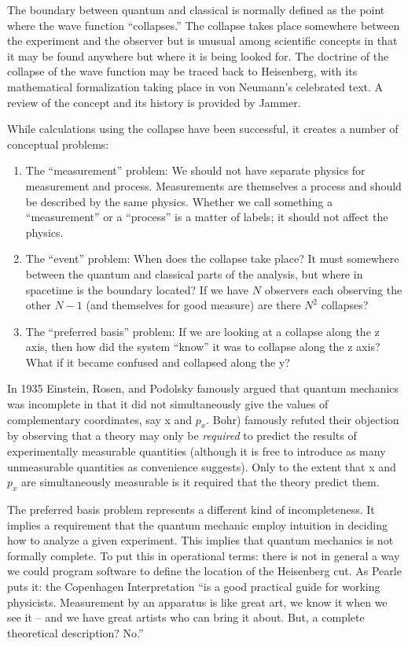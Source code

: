 \documentclass[aps,prl,superscriptaddress,12pt]{revtex4-2}
\begin{document}
The boundary between quantum and classical is normally defined as the point where the wave function ``collapses.''
The collapse takes place somewhere between the experiment and the observer 
	but is unusual among scientific concepts in that it may be found anywhere 
	but where it is being looked for. 
The doctrine of the collapse of the wave function may be traced back to Heisenberg\cite{Heisenberg:1930}, 
	with its mathematical formalization taking place in von Neumann's celebrated text\cite{vonNeumann:1955}. 
A review of the concept and its history is provided by Jammer\cite{Jammer:1966,Jammer:1974}.

While calculations using the collapse have been successful, 
	it creates a number of conceptual problems\cite{Ghose:1999}:
\begin{enumerate}
\item The ``measurement'' problem: 
	We should not have separate physics for measurement and process. 
	Measurements are themselves a process 
		and should be described by the same physics. 
	Whether we call something a ``measurement'' or a ``process'' 
		is a matter of labels; it should not affect the physics.
\item The ``event'' problem: 
	When does the collapse take place? 
	It must somewhere between the quantum and classical parts of the analysis, 
		but where in spacetime is the boundary located? 
	If we have $N$ observers each observing the other $N - 1$ 
		(and themselves for good measure) 
		are there $N^{2}$ collapses?
\item The ``preferred basis'' problem: 
	If we are looking at a collapse along the z axis, 
		then how did the system ``know'' it was to collapse along the z axis? 
	What if it became confused and collapsed along the y?
\end{enumerate}

In 1935 Einstein, Rosen, and Podolsky\cite{Einstein:1935} famously argued that quantum mechanics was incomplete 
in that it did not simultaneously give the values of complementary coordinates, say x and $p_x$.  
Bohr\cite{Bohr:1935}) famously refuted their objection by observing 
that a theory may only be \emph{required} to predict the results of experimentally measurable quantities 
(although it is free to introduce as many unmeasurable quantities as convenience suggests).
Only to the extent that  x and $p_x$ are simultaneously measurable 
	is it required that the theory predict them.

The preferred basis problem represents a different kind of incompleteness.
It implies a requirement that the quantum mechanic employ intuition 
	in deciding how to analyze a given experiment. 
This implies that quantum mechanics is not formally complete.
To put this in operational terms:
	there is not in general a way we could program software 
	to define the location of the Heisenberg cut. 
As Pearle\cite{Pearle:1994} puts it: the Copenhagen Interpretation 
	``is a good practical guide for working physicists. 
	Measurement by an apparatus is like great art, we know it when we see it
	-- and we have great artists who can bring it about. 
	But, a complete theoretical description? No.''
\end{document}
